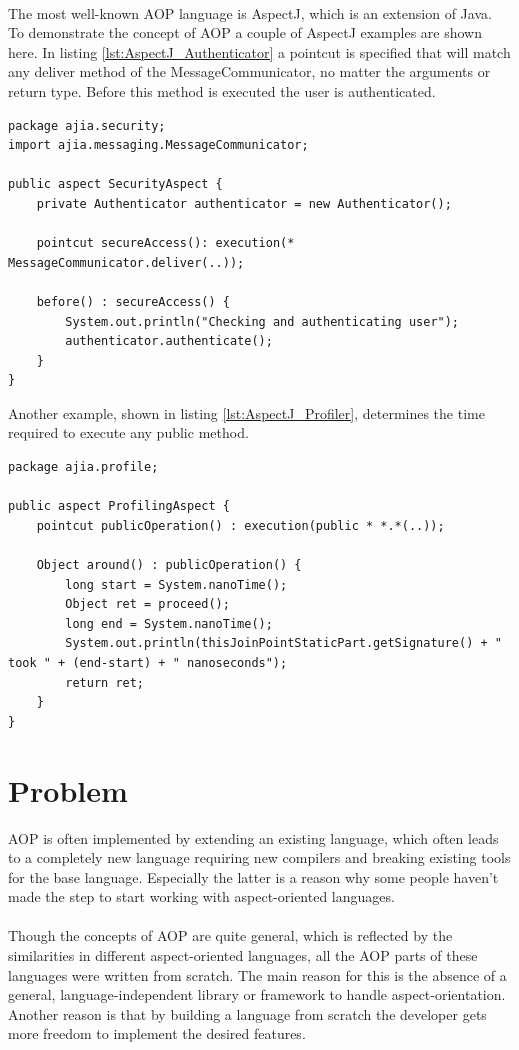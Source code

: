 \documentclass[a4paper]{report}
\begin{document}
\\
The most well-known AOP language is AspectJ, which is an extension of Java. To demonstrate the concept of AOP a couple of AspectJ examples are shown here. In listing \ref{lst:AspectJ_Authenticator} a pointcut is specified that will match any deliver method of the MessageCommunicator, no matter the arguments or return type. Before this method is executed the user is authenticated.
\begin{lstlisting}[caption=An aspect to authenticate the user.,label=lst:AspectJ_Authenticator]
package ajia.security;
import ajia.messaging.MessageCommunicator;

public aspect SecurityAspect {
	private Authenticator authenticator = new Authenticator();

	pointcut secureAccess(): execution(* MessageCommunicator.deliver(..));
	
	before() : secureAccess() {
		System.out.println("Checking and authenticating user");
		authenticator.authenticate();
	}
}
\end{lstlisting}
Another example, shown in listing \ref{lst:AspectJ_Profiler}, determines the time required to execute any public method.
\begin{lstlisting}[caption=An aspect to profile methods.,label=lst:AspectJ_Profiler]
package ajia.profile;

public aspect ProfilingAspect {
	pointcut publicOperation() : execution(public * *.*(..));

	Object around() : publicOperation() {
		long start = System.nanoTime();
		Object ret = proceed();
		long end = System.nanoTime();
		System.out.println(thisJoinPointStaticPart.getSignature() + " took " + (end-start) + " nanoseconds");
		return ret;
	}
}
\end{lstlisting}

\section{Problem}
AOP is often implemented by extending an existing language, which often leads to a completely new language requiring new compilers and  breaking existing tools for the base language. Especially the latter is a reason why some people haven't made the step to start working with aspect-oriented languages.\\
\\
Though the concepts of AOP are quite general, which is reflected by the similarities in different aspect-oriented languages, all the AOP parts of these languages were written from scratch. The main reason for this is the absence of a general, language-independent library or framework to handle aspect-orientation. Another reason is that by building a language from scratch the developer gets more freedom to implement the desired features.
\end{document}
